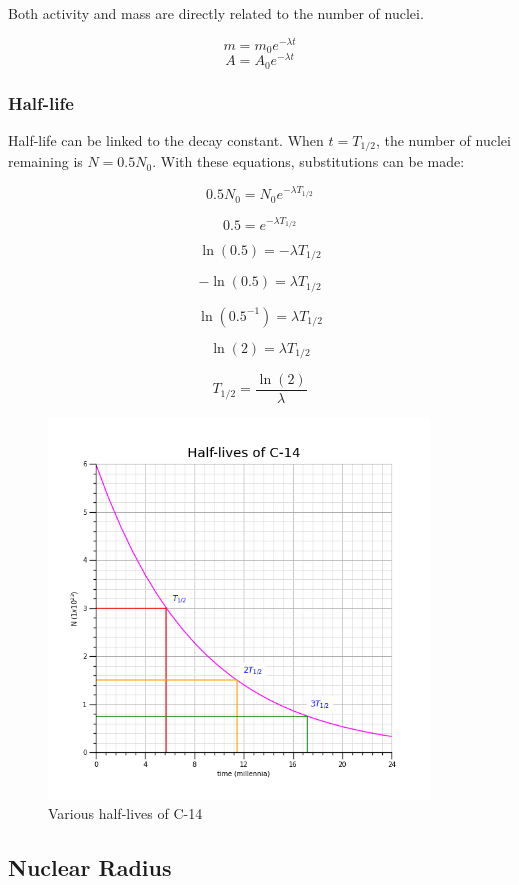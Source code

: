 \documentclass[12pt]{article}
\begin{document}
Both activity and mass are directly related to the number of nuclei.

\[m = m_0 e^{- \lambda t}\]
\[A = A_0 e^{- \lambda t}\]

\subsubsection{Half-life}
\label{sec:orgdecc185}

Half-life can be linked to the decay constant. When \(t= T_{1/2}\), the number of nuclei remaining is \(N = 0.5N_0\). With these equations, substitutions can be made:

\[0.5N_0 = N_0 e^{-\lambda T_{1/2}}\]

\[0.5 = e^{-\lambda T_{1/2}}\]

\[\ln (0.5) = -\lambda T_{1/2}\]

\[-\ln (0.5) = \lambda T_{1/2}\]

\[\ln (0.5^{-1}) = \lambda T_{1/2}\]

\[\ln (2) = \lambda T_{1/2}\]

\[T_{1/2} = \dfrac{\ln(2)}{\lambda}\]

\begin{figure}[H]
\centering
\includegraphics[width=0.9\textwidth,keepaspectratio]{./images/c-14_t_half.png}
\caption{Various half-lives of C-14}
\end{figure}

\subsection{Nuclear Radius}
\label{sec:org75c81ad}
\end{document}
